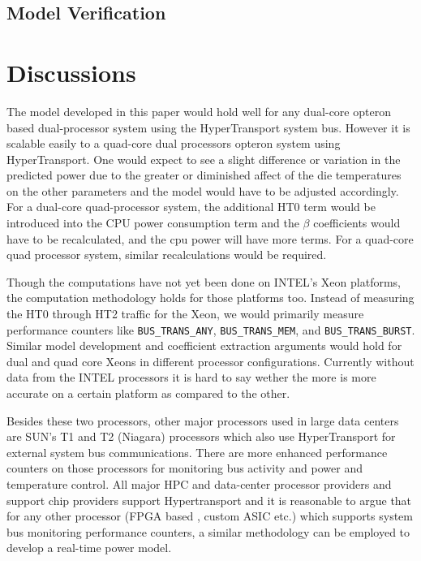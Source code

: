 \documentclass[times, 10pt,onecolumn]{article}
\begin{document}
\subsection{Model Verification}
\label{sec:linearreg}


\section{Discussions}
\label{sec:conclusions}
The model developed in this paper would hold well for any dual-core
opteron based dual-processor system using the HyperTransport system
bus. However it is scalable easily to a quad-core dual processors
opteron system using HyperTransport. One would expect to see a slight
difference or variation in the predicted power due to the greater or
diminished affect of the die temperatures on the other parameters and
the model would have to be adjusted accordingly. For a dual-core
quad-processor system, the additional HT0 term would be introduced
into the CPU power consumption term and the
$\beta$ coefficients would have to be recalculated, and the cpu power
will have more terms. For a quad-core quad processor system, similar
recalculations would be required.

Though the computations have not yet been done on INTEL's Xeon
platforms, the computation methodology holds for those platforms too.
Instead of measuring the HT0 through HT2 traffic for the Xeon, we would
primarily measure performance counters like \texttt{BUS\_TRANS\_ANY},
\texttt{BUS\_TRANS\_MEM}, and \texttt{BUS\_TRANS\_BURST}.  Similar model
development and coefficient extraction arguments would hold for dual and
quad core Xeons in different processor configurations. Currently without
data from the INTEL processors it is hard to say wether the more is more
accurate on a certain platform as compared to the other.

Besides these two processors, other major processors used in large
data centers are SUN's T1 and T2 (Niagara) processors which also use
HyperTransport for external system bus communications. There are more
enhanced performance counters on those processors for monitoring bus
activity and power and temperature control. All major HPC and
data-center processor providers and support chip providers support
Hypertransport and it is reasonable to argue that for any other
processor (FPGA based , custom ASIC etc.) which supports system bus
monitoring performance counters, a similar methodology can be
employed to develop a real-time power model.
\end{document}
